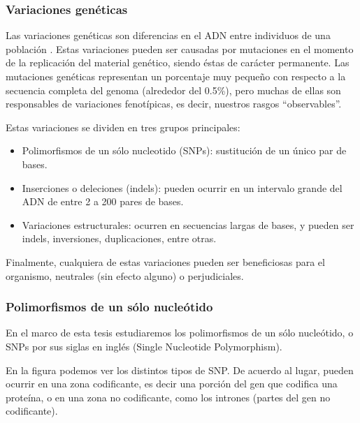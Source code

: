 \newpage


\subsubsection{Variaciones genéticas}

Las variaciones genéticas son diferencias en el ADN entre individuos de una población \cite{EMBL}. Estas variaciones pueden ser causadas por mutaciones en el momento de la replicación del material genético, siendo éstas de carácter permanente. Las mutaciones genéticas representan un porcentaje muy pequeño con respecto a la secuencia completa del genoma (alrededor del 0.5\%), pero muchas de ellas son responsables de variaciones fenotípicas, es decir, nuestros rasgos ``observables''. 

Estas variaciones se dividen en tres grupos principales:

\begin{itemize}
    \item Polimorfismos de un sólo nucleotido (SNPs): sustitución de un único par de bases. 
    \item Inserciones o deleciones (indels): pueden ocurrir en un intervalo grande del ADN de entre 2 a 200 pares de bases.
    \item Variaciones estructurales: ocurren en secuencias largas de bases, y pueden ser indels, inversiones, duplicaciones, entre otras.
    
\end{itemize}

Finalmente, cualquiera de estas variaciones pueden ser beneficiosas para el organismo, neutrales (sin efecto alguno) o perjudiciales. 

\subsubsection{Polimorfismos de un sólo nucleótido}

En el marco de esta tesis estudiaremos los polimorfismos de un sólo nucleótido, o SNPs por sus siglas en inglés (Single Nucleotide Polymorphism). 

En la figura  podemos ver los distintos tipos de SNP. De acuerdo al lugar, pueden ocurrir en una zona codificante, es decir una porción del gen que codifica una proteína, o en una zona no codificante, como los intrones (partes del gen no codificante).

